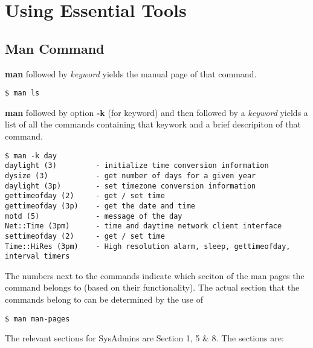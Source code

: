 \chapter{Using Essential Tools}
\section{Man Command}

\textbf{man} followed by \textit{keyword} yields the manual page of that command.
\vspace{-20pt}
\begin{verbatim}
$ man ls
\end{verbatim}

\vspace{-15pt}
\noindent
\textbf{man} followed by option \textbf{-k} (for keyword) and then followed by a \textit{keyword} yields a list of all the commands containing that keywork and a brief descripiton of that command.
\vspace{-20pt}
\begin{verbatim}
$ man -k day
daylight (3)         - initialize time conversion information
dysize (3)           - get number of days for a given year
daylight (3p)        - set timezone conversion information
gettimeofday (2)     - get / set time
gettimeofday (3p)    - get the date and time
motd (5)             - message of the day
Net::Time (3pm)      - time and daytime network client interface
settimeofday (2)     - get / set time
Time::HiRes (3pm)    - High resolution alarm, sleep, gettimeofday, interval timers
\end{verbatim}

\vspace{-15pt}
\noindent
The numbers next to the commands indicate which seciton of the man pages the command belongs to (based on their functionality). The actual section that the commands belong to can be determined by the use of

\vspace{-20pt}
\begin{verbatim}
$ man man-pages
\end{verbatim}

\vspace{-15pt}
\noindent
The relevant sections for SysAdmins are Section 1, 5 \& 8. The sections are:

